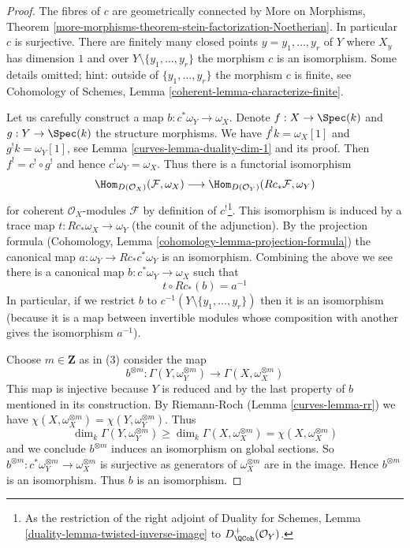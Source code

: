\begin{proof}

The fibres of $c$ are geometrically connected by
More on Morphisms, Theorem
\ref{more-morphisms-theorem-stein-factorization-Noetherian}.
In particular $c$ is surjective.
There are finitely many closed points $y = y_1, \ldots, y_r$ of $Y$ where
$X_y$ has dimension $1$ and over $Y \setminus \{y_1, \ldots, y_r\}$
the morphism $c$ is an isomorphism.
Some details omitted; hint: outside of $\{y_1, \ldots, y_r\}$
the morphism $c$ is finite, see
Cohomology of Schemes, Lemma \ref{coherent-lemma-characterize-finite}.

\medskip\noindent
Let us carefully construct a map $b : c^*\omega_Y \to \omega_X$.
Denote $f : X \to \Spec(k)$ and $g : Y \to \Spec(k)$ the structure
morphisms. We have $f^!k = \omega_X[1]$ and $g^!k = \omega_Y[1]$, see
Lemma \ref{curves-lemma-duality-dim-1} and its proof. Then
$f^! = c^! \circ g^!$ and hence $c^!\omega_Y = \omega_X$.
Thus there is a functorial isomorphism
$$
\Hom_{D(\mathcal{O}_X)}(\mathcal{F}, \omega_X)
\longrightarrow
\Hom_{D(\mathcal{O}_Y)}(Rc_*\mathcal{F}, \omega_Y)
$$
for coherent $\mathcal{O}_X$-modules $\mathcal{F}$ by definition
of $c^!$\footnote{As the restriction of the right adjoint of
Duality for Schemes, Lemma \ref{duality-lemma-twisted-inverse-image} to
$D^+_\QCoh(\mathcal{O}_Y)$.}.
This isomorphism is induced by a trace map $t : Rc_*\omega_X \to \omega_Y$
(the counit of the adjunction). By the projection formula
(Cohomology, Lemma \ref{cohomology-lemma-projection-formula})
the canonical map $a : \omega_Y \to Rc_*c^*\omega_Y$ is an isomorphism.
Combining the above we see there is a canonical map
$b : c^*\omega_Y \to \omega_X$ such that
$$
t \circ Rc_*(b) = a^{-1}
$$
In particular, if we restrict $b$ to $c^{-1}(Y \setminus \{y_1, \ldots, y_r\})$
then it is an isomorphism (because it is a map between invertible modules
whose composition with another gives the isomorphism $a^{-1}$).

\medskip\noindent
Choose $m \in \mathbf{Z}$ as in (3) consider the map
$$
b^{\otimes m} :
\Gamma(Y, \omega_Y^{\otimes m})
\longrightarrow
\Gamma(X, \omega_X^{\otimes m})
$$
This map is injective because $Y$ is reduced and by the last
property of $b$ mentioned in its construction.
By Riemann-Roch (Lemma \ref{curves-lemma-rr}) we have
$\chi(X, \omega_X^{\otimes m}) =\chi(Y, \omega_Y^{\otimes m})$.
Thus
$$
\dim_k \Gamma(Y, \omega_Y^{\otimes m}) \geq
\dim_k \Gamma(X, \omega_X^{\otimes m}) = \chi(X, \omega_X^{\otimes m})
$$
and we conclude $b^{\otimes m}$ induces an isomorphism on global
sections. So
$b^{\otimes m} : c^*\omega_Y^{\otimes m} \to \omega_X^{\otimes m}$
is surjective as generators of $\omega_X^{\otimes m}$ are in the image.
Hence $b^{\otimes m}$ is an isomorphism. Thus $b$ is an isomorphism.
\end{proof}

